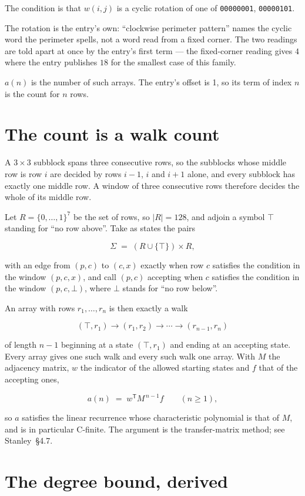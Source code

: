 \documentclass[11pt]{article}
\theoremstyle{definition}
\begin{document}
The condition is that $w(i,j)$ is a cyclic rotation of one of \texttt{00000001}, \texttt{00000101}.

The rotation is the entry's own: ``clockwise perimeter pattern'' names the cyclic word the perimeter spells, not a word read from a fixed corner. The two readings are told apart at once by the entry's first term --- the fixed-corner reading gives $4$ where the entry publishes $18$ for the smallest case of this family.

$a(n)$ is the number of such arrays. The entry's offset is 1, so its term of index $n$ is the count for $n$ rows.

\section{The count is a walk count}

A $3 \times 3$ subblock spans three consecutive rows, so the subblocks whose middle row is row $i$ are decided by rows $i-1$, $i$ and $i+1$ alone, and every subblock has exactly one middle row. A window of three consecutive rows therefore decides the whole of its middle row.

Let $R = \{0,\dots,1\}^{7}$ be the set of rows, so $|R| = 128$, and adjoin a symbol $\top$ standing for ``no row above''. Take as states the pairs

\[\Sigma \;=\; (R \cup \{\top\}) \times R,\]

with an edge from $(p,c)$ to $(c,x)$ exactly when row $c$ satisfies the condition in the window $(p,c,x)$, and call $(p,c)$ accepting when $c$ satisfies the condition in the window $(p,c,\bot)$, where $\bot$ stands for ``no row below''.

An array with rows $r_1,\dots,r_n$ is then exactly a walk

\[(\top,r_1) \to (r_1,r_2) \to \cdots \to (r_{n-1},r_n)\]

of length $n-1$ beginning at a state $(\top,r_1)$ and ending at an accepting state. Every array gives one such walk and every such walk one array. With $M$ the adjacency matrix, $w$ the indicator of the allowed starting states and $f$ that of the accepting ones,

\[a(n) \;=\; w^{\mathsf T} M^{\,n-1} f \qquad (n \ge 1),\]

so $a$ satisfies the linear recurrence whose characteristic polynomial is that of $M$, and is in particular C-finite. The argument is the transfer-matrix method; see Stanley~\S4.7.

\section{The degree bound, derived}
\end{document}

